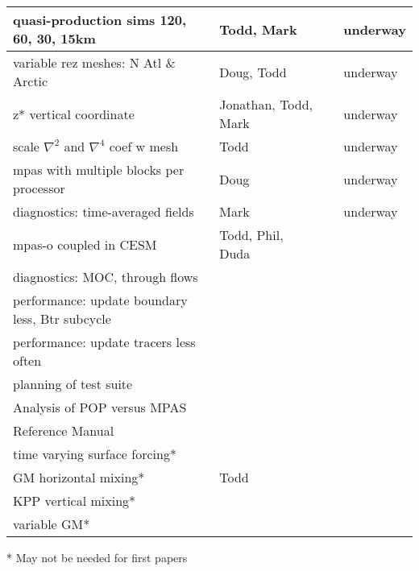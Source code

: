 \documentclass[11pt,titlepage,twoside]{article}
\begin{document}
\begin{tabular}{| l || l | l | l |}
quasi-production sims 120, 60, 30, 15km & Todd, Mark & & underway \\ \hline
variable rez meshes: N Atl \& Arctic & Doug, Todd & & underway \\ \hline
z* vertical coordinate & Jonathan, Todd, Mark  & & underway \\ \hline
scale $\nabla^2$ and $\nabla^4$ coef w mesh &  Todd & & underway  \\ \hline
mpas with multiple blocks per processor &  Doug &  & underway  \\ \hline
diagnostics: time-averaged fields & Mark & & underway \\ \hline
\hline
mpas-o coupled in CESM & Todd, Phil, Duda & &  \\ \hline
diagnostics: MOC, through flows & & & \\ \hline
performance: update boundary less, Btr subcycle & & & \\ \hline
performance: update tracers less often              & & & \\ \hline
planning of test suite & & & \\ \hline
Analysis of POP versus MPAS &  &  & \\ \hline
Reference Manual & & & \\ \hline
time varying surface forcing* & & & \\ \hline
GM horizontal mixing* & Todd &  & \\ \hline
KPP vertical mixing* &  &  & \\ \hline
variable GM*&  &  & \\ \hline
\end{tabular}
* May not be needed for first papers
\end{document}
